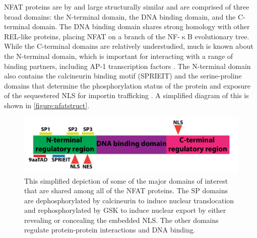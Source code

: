NFAT proteins are by and large structurally similar and are comprised of three broad domains: the N\hyp{}terminal domain, the DNA binding domain, and the C\hyp{}terminal domain. The DNA binding domain shares strong homology with other REL\hyp{}like proteins, placing NFAT on a branch of the NF\hyp{}$\upkappa$B evolutionary tree. While the C\hyp{}terminal domains are relatively understudied, much is known about the N\hyp{}terminal domain, which is important for interacting with a range of binding partners, including AP\hyp{}1 transcription factors \citep{Boise1993, Martinez2015}. The N\hyp{}terminal domain also contains the calcineurin binding motif (SPRIEIT) and the serine\hyp{}proline domains that determine the phosphorylation status of the protein and exposure of the sequestered NLS for importin trafficking \citep{Rao1997}. A simplified diagram of this is shown in \autoref{figure:nfatstruct}. 

\begin{figure}
\centering
\includegraphics[width=\textwidth]{images/nfatstruct.pdf}
\caption{This simplified depiction of some of the major domains of interest that are shared among all of the NFAT proteins. The SP domains are dephosphorylated by calcineurin to induce nuclear translocation and rephosphorylated by GSK to induce nuclear export by either revealing or concealing the embedded NLS. The other domains regulate protein\hyp{}protein interactions and DNA binding.}
\label{figure:nfatstruct}
\end{figure}

